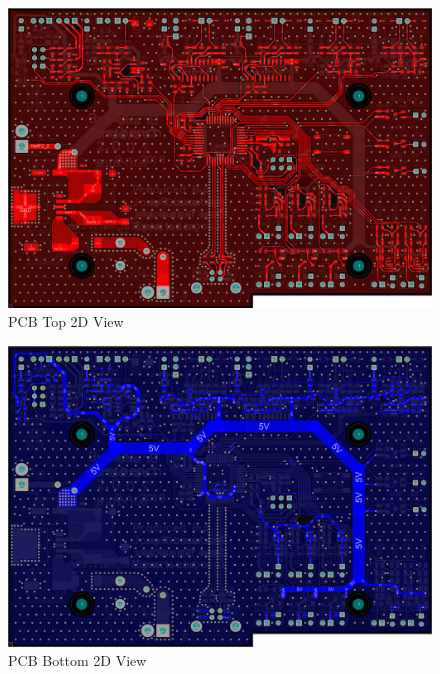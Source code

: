		\begin{figure}[htbp]
			\centering
			\includegraphics[scale=0.5]{figuras/fig-pcb-design-top.png}
			\caption{PCB Top 2D View}
			\label{fig:pcb-design-top}
		\end{figure}

		\begin{figure}[htbp]
			\centering
			\includegraphics[scale=0.5]{figuras/fig-pcb-design-bottom.png}
			\caption{PCB Bottom 2D View}
			\label{fig:pcb-design-bottom}
		\end{figure}

